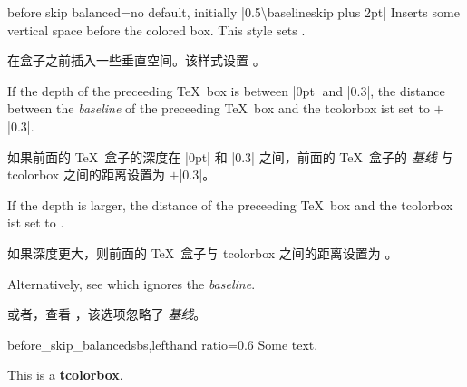 
\begin{docTcbKey}[][doc new={2020-09-25}]{before skip balanced}{=}{no default, initially |0.5\textbackslash baselineskip plus 2pt|}
Inserts some vertical space before the colored box. This style sets .\par
在盒子之前插入一些垂直空间。该样式设置 。\par
If the depth of the
preceeding \TeX\ box is between |0pt| and |0.3\baselineskip|,
the distance between the \emph{baseline} of the preceeding \TeX\ box and the tcolorbox
ist set to $+$|0.3\baselineskip|.\par
如果前面的 \TeX\ 盒子的深度在 |0pt| 和 |0.3\baselineskip| 之间，前面的 \TeX\ 盒子的 \emph{基线} 与 tcolorbox 之间的距离设置为 $+$|0.3\baselineskip|。\par
If the depth is larger, the distance of the preceeding \TeX\ box and the tcolorbox
ist set to .\par
如果深度更大，则前面的 \TeX\ 盒子与 tcolorbox 之间的距离设置为 。\par
Alternatively, see  which ignores the \emph{baseline}.

 或者，查看 ，该选项忽略了 \emph{基线}。

\begin{exdispExample*}{before_skip_balanced}{sbs,lefthand ratio=0.6}
Some text.
\begin{tcolorbox}[before skip balanced=1cm,
colframe=red!50!white]
This is a \textbf{tcolorbox}.
\end{tcolorbox}
\end{exdispExample*}
\end{docTcbKey}


